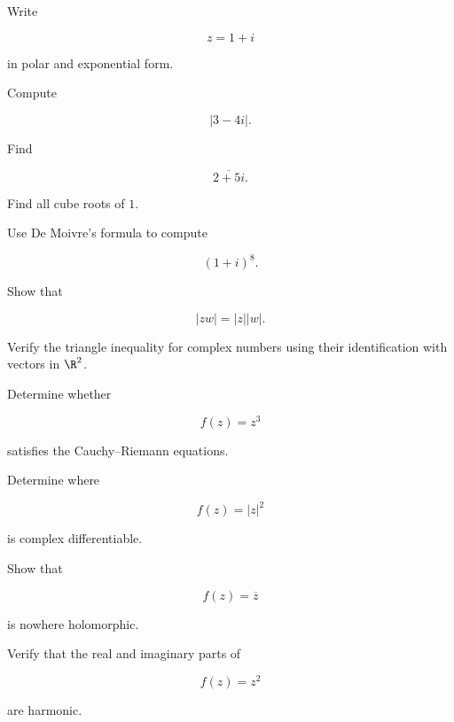 \begin{exercise}[1]
Write

\[
z=1+i
\]

in polar and exponential form.
\end{exercise}

\begin{exercise}[1]
Compute

\[
|3-4i|.
\]
\end{exercise}

\begin{exercise}[1]
Find

\[
\overline{2+5i}.
\]
\end{exercise}

\begin{exercise}[1]
Find all cube roots of \(1\).
\end{exercise}

\begin{exercise}[1]
Use De Moivre's formula to compute

\[
(1+i)^8.
\]
\end{exercise}

\begin{exercise}[2]
Show that

\[
|zw|=|z||w|.
\]
\end{exercise}

\begin{exercise}[2]
Verify the triangle inequality for complex numbers using their
identification with vectors in \(\R^2\).
\end{exercise}

\begin{exercise}[2]
Determine whether

\[
f(z)=z^3
\]

satisfies the Cauchy--Riemann equations.
\end{exercise}

\begin{exercise}[2]
Determine where

\[
f(z)=|z|^2
\]

is complex differentiable.
\end{exercise}

\begin{exercise}[2]
Show that

\[
f(z)=\overline{z}
\]

is nowhere holomorphic.
\end{exercise}

\begin{exercise}[2]
Verify that the real and imaginary parts of

\[
f(z)=z^2
\]

are harmonic.
\end{exercise}

